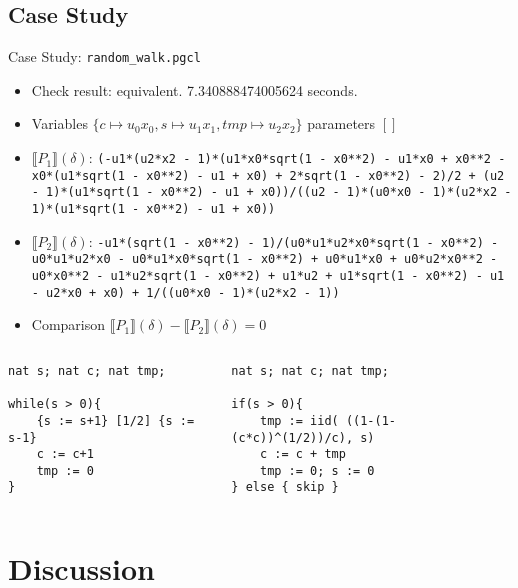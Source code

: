 \documentclass[8pt]{beamer}
\renewcommand{\S}[1]{ \llbracket #1 \rrbracket }
\begin{document}
\subsection{Case Study}
\begin{frame}{Case Study: \texttt{random_walk.pgcl}}
	\begin{itemize}
		\item Check result: equivalent. 7.340888474005624 seconds.
		\item Variables \(\{c\mapsto u_0x_0, s\mapsto u_1x_1, tmp\mapsto u_2x_2\}\) parameters \([]\)\\
		\item \(\S{P_1}(\delta)\): \texttt{(-u1*(u2*x2 - 1)*(u1*x0*sqrt(1 - x0**2) - u1*x0 + x0**2 - x0*(u1*sqrt(1 - x0**2) - u1 + x0) + 2*sqrt(1 - x0**2) - 2)/2 + (u2 - 1)*(u1*sqrt(1 - x0**2) - u1 + x0))/((u2 - 1)*(u0*x0 - 1)*(u2*x2 - 1)*(u1*sqrt(1 - x0**2) - u1 + x0))}
		\item \(\S{P_2}(\delta)\): \texttt{-u1*(sqrt(1 - x0**2) - 1)/(u0*u1*u2*x0*sqrt(1 - x0**2) - u0*u1*u2*x0 - u0*u1*x0*sqrt(1 - x0**2) + u0*u1*x0 + u0*u2*x0**2 - u0*x0**2 - u1*u2*sqrt(1 - x0**2) + u1*u2 + u1*sqrt(1 - x0**2) - u1 - u2*x0 + x0) + 1/((u0*x0 - 1)*(u2*x2 - 1))}
		\item Comparison \(\S{P_1}(\delta)-\S{P_2}(\delta)=0\)
	\end{itemize}

	\begin{columns}
		\begin{column}{0.5\textwidth}
			\begin{verbatim}
nat s; nat c; nat tmp;

while(s > 0){
    {s := s+1} [1/2] {s := s-1}
    c := c+1
    tmp := 0
} \end{verbatim}
		\end{column}
		\begin{column}{0.5\textwidth}
			\begin{verbatim}
nat s; nat c; nat tmp;

if(s > 0){
    tmp := iid( ((1-(1-(c*c))^(1/2))/c), s)
    c := c + tmp
    tmp := 0; s := 0
} else { skip } \end{verbatim}
		\end{column}
	\end{columns}
\end{frame}

\section{Discussion}
\end{document}
